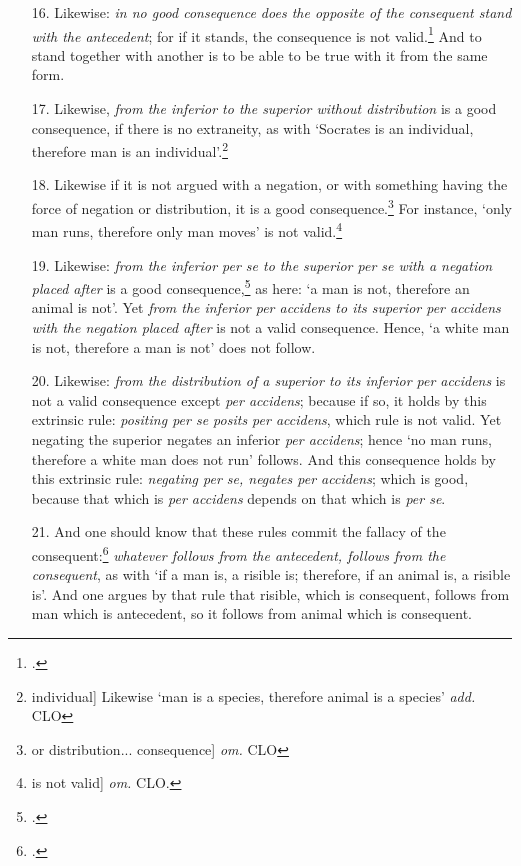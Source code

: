 \begin{itemize}
\item[16.] Likewise: \textit{in no good consequence does the opposite of the consequent stand with the antecedent}; for if it stands, the consequence is not valid.\footnote{\cite[p. 63.30]{BurleyDPAL}.} And to stand together with another is to be able to be true with it from the same form.
\item[17.] Likewise, \textit{from the inferior to the superior without distribution} is a good consequence, if there is no extraneity, as with `Socrates is an individual, therefore man is an individual'.\footnote{individual] Likewise `man is a species, therefore animal is a species' \textit{add.} CLO}
\item[18.] Likewise if it is not argued with a negation, or with something having the force of negation or distribution, it is a good consequence.\footnote{or distribution... consequence] \textit{om.} CLO} For instance,  `only man runs, therefore only man moves' is not valid.\footnote{is not valid] \textit{om.} CLO.}
\item[19.]Likewise: \textit{from the inferior per se to the superior per se with a negation placed after} is a good consequence,\footnote{\cite[p. 210.17]{BurleyDPAL}.} as here: `a man is not, therefore an animal is not'. Yet \textit{from the inferior per accidens to its superior per accidens with the negation placed after} is not a valid consequence. Hence, `a white man is not, therefore a man is not' does not follow.
\item[20.] Likewise: \textit{from the distribution of a superior to its inferior per accidens} is not a valid consequence except \textit{per accidens}; because if so, it holds by this extrinsic rule: \textit{positing per se posits per accidens}, which rule is not valid. Yet negating the superior negates an inferior \textit{per accidens}; hence `no man runs, therefore a white man does not run' follows. And this consequence holds by this extrinsic rule: \textit{negating per se, negates per accidens}; which is good, because that which is \textit{per accidens} depends on that which is \textit{per se}.
\item[21.] And one should know that these rules commit the fallacy of the consequent:\footnote{\cite[p. 62.14; p. 200.16]{BurleyDPAL}.} \textit{whatever follows from the antecedent, follows from the consequent}, as with `if a man is, a risible is; therefore, if an animal is, a risible is'. And one argues by that rule that risible, which is consequent, follows from man which is antecedent, so it follows from animal which is consequent.

\end{itemize}
